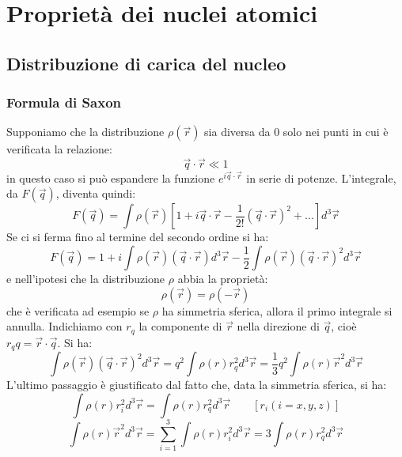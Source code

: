 \chapter{Proprietà dei nuclei atomici}
\section{Distribuzione di carica del nucleo}
\subsection{Formula di Saxon}
Supponiamo  che la distribuzione $\rho{(\vec{r})}$ sia 
diversa da 0 solo nei punti in cui è verificata la relazione:
\begin{equation}
\vec{q} \cdot \vec{r} \ll 1
\end{equation}
in questo caso si può espandere la funzione $e^{i\vec{q} \cdot \vec{r}}$ in
serie di potenze. L'integrale, da $F{(\vec{q})}$, diventa quindi:
\begin{equation}
F{(\vec{q})} = \int \rho{(\vec{r})} \left[ 1 + i\vec{q} \cdot \vec{r} - 
\frac{1}{2!}(\vec{q} \cdot \vec{r})^2 + ... \right] d^3\vec{r}
\end{equation}
Se ci si ferma fino al termine del secondo ordine si ha:
\begin{equation}
F{(\vec{q})} = 1 + i\int \rho{(\vec{r})}(\vec{q} \cdot \vec{r}) d^3\vec{r} - 
\frac{1}{2} \int \rho{(\vec{r})}(\vec{q} \cdot \vec{r})^2 d^3\vec{r}
\end{equation}
e nell'ipotesi che la distribuzione $\rho$ abbia la proprietà:
\begin{equation}
\rho{(\vec{r})} = \rho{(-\vec{r})}
\end{equation}
che è verificata ad esempio se $\rho$ ha simmetria sferica, allora il primo
integrale si annulla. Indichiamo con $r_q$ la componente di $\vec{r}$ nella
direzione di $\vec{q}$, cioè $r_q q = \vec{r} \cdot \vec{q}$. Si ha:
\begin{equation}
\int \rho{(\vec{r})}(\vec{q} \cdot \vec{r})^2 d^3\vec{r} = q^2 \int \rho{(r)} 
r_q^2  d^3\vec{r} = \frac{1}{3} q^2 \int \rho{(r)} \vec{r}^2 d^3\vec{r}
\end{equation}
L'ultimo passaggio è giustificato dal fatto che, data la simmetria sferica, si
ha:
\begin{equation}
\int \rho{(r)} r_i^2 d^3\vec{r} = \int \rho{(r)} r_q^2 d^3\vec{r} \qquad [r_i 
(i = x,y,z)]
\end{equation}
\begin{equation}
\int \rho{(r)} \vec{r}^2 d^3\vec{r} = \sum_{i=1}^3 \int \rho{(r)} r_i^2 
d^3\vec{r} = 3 \int \rho{(r)} r_q^2 d^3\vec{r}
\end{equation}

